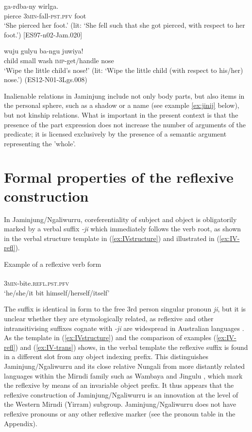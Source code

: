 \documentclass[output=paper,colorlinks,citecolor=brown]{langscibook}
\begin{document}
\ea
{} {ga-rdba-ny} {wirlga}. \\
pierce \textsc{3min}-fall-\textsc{pst.pfv} foot \\
\glt `She pierced her foot.' (lit: `She fell such that she got pierced, with respect to her foot.') [ES97-n02-Jam.020]
\label{ex:lurr gardbany wirlga}
\z

\ea
{} {wuju} {gulyu} {ba-ngu} {juwiya}! \\
child small wash \textsc{imp}-get/handle nose \\
\glt `Wipe the little child's nose!' (lit: `Wipe the little child (with respect to his/her) nose.') (ES12-N01-3Lgs.008)
\label{ex:Jarlig wuju gulyu}
\z

Inalienable relations in Jaminjung include not only body parts, but also items in the personal sphere, such as a shadow or a name (see example \ref{ex:jinij} below), but not kinship relations. What is important in the present context is that the presence of the part expression does not increase the number of arguments of the predicate; it is licensed exclusively by the presence of a semantic argument representing the 'whole'. 


\section{Formal properties of the reflexive construction} \label{sec:SchultzeBernd:3}


In Jaminjung/Ngaliwurru, coreferentiality of subject and object is obligatorily marked by a verbal suffix \textit{-ji} which immediately follows the verb root, as shown in the verbal structure template in (\ref{ex:IVstructure}) and illustrated in (\ref{ex:IV-refl}).

\ea Example of a reflexive verb form \\
\\
\textsc{3min}-bite.\textsc{refl.pst.pfv}\\ 
\glt `he/she/it bit himself/herself/itself'
\label{ex:IV-refl}
\z

The suffix is identical in form to the free 3rd person singular pronoun \textit{ji}, but it is unclear whether they are etymologically related, as reflexive and other intransitivising suffixes cognate with \textit{-ji} are widespread in Australian languages \citep[321]{Dixon2002}. As the template in (\ref{ex:IVstructure}) and the comparison of examples (\ref{ex:IV-refl}) and (\ref{ex:IV-trans}) shows, in the verbal template the reflexive suffix is found in a different slot from any object indexing prefix. This distinguishes Jaminjung/Ngaliwurru and its close relative Nungali from more distantly related languages within the Mirndi family such as Wambaya \citep{Nordlinger1998} and Jingulu \citep{Pensalfini2003}, which mark the reflexive by means of an invariable object prefix. It thus appears that the reflexive construction of Jaminjung/Ngaliwurru is an innovation at the level of the Western Mirndi (Yirram) subgroup.
Jaminjung/Ngaliwurru does not have reflexive pronouns or any other reflexive marker (see the pronoun table in the Appendix).
\end{document}
